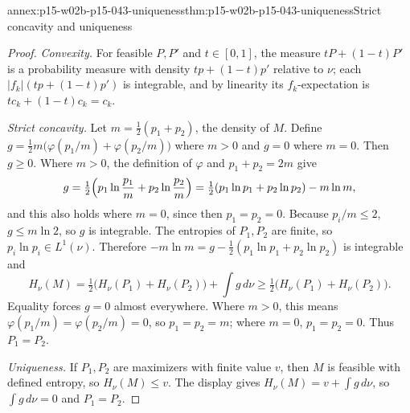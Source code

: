 \begin{annexitem}{annex:p15-w02b-p15-043-uniqueness}{thm:p15-w02b-p15-043-uniqueness}{Strict concavity and uniqueness}
\begin{proof}
\emph{Convexity.} For feasible \(P,P'\) and \(t\in[0,1]\), the measure
\(tP+(1-t)P'\) is a probability measure with density \(tp+(1-t)p'\) relative
to \(\nu\); each \(|f_k|(tp+(1-t)p')\) is integrable, and by linearity its
\(f_k\)-expectation is \(tc_k+(1-t)c_k=c_k\).

\emph{Strict concavity.} Let \(m=\tfrac12(p_1+p_2)\), the density of \(M\).
Define \(g=\tfrac12m\bigl(\varphi(p_1/m)+\varphi(p_2/m)\bigr)\) where
\(m>0\) and \(g=0\) where \(m=0\). Then \(g\geq0\). Where \(m>0\), the
definition of \(\varphi\) and \(p_1+p_2=2m\) give
\[
 g=\tfrac12\Bigl(p_1\ln\frac{p_1}m+p_2\ln\frac{p_2}m\Bigr)
  =\tfrac12(p_1\ln p_1+p_2\ln p_2)-m\ln m ,
\]
and this also holds where \(m=0\), since then \(p_1=p_2=0\). Because
\(p_i/m\leq2\), \(g\leq m\ln2\), so \(g\) is integrable. The entropies of
\(P_1,P_2\) are finite, so \(p_i\ln p_i\in L^1(\nu)\). Therefore
\(-m\ln m=g-\tfrac12(p_1\ln p_1+p_2\ln p_2)\) is integrable and
\[
 H_\nu(M)=\tfrac12\bigl(H_\nu(P_1)+H_\nu(P_2)\bigr)+\int g\,d\nu
        \geq\tfrac12\bigl(H_\nu(P_1)+H_\nu(P_2)\bigr).
\]
Equality forces \(g=0\) almost everywhere. Where \(m>0\), this means
\(\varphi(p_1/m)=\varphi(p_2/m)=0\), so \(p_1=p_2=m\); where \(m=0\),
\(p_1=p_2=0\). Thus \(P_1=P_2\).

\emph{Uniqueness.} If \(P_1,P_2\) are maximizers with finite value \(v\), then
\(M\) is feasible with defined entropy, so \(H_\nu(M)\leq v\). The display gives
\(H_\nu(M)=v+\int g\,d\nu\), so \(\int g\,d\nu=0\) and \(P_1=P_2\).
\end{proof}
\end{annexitem}

